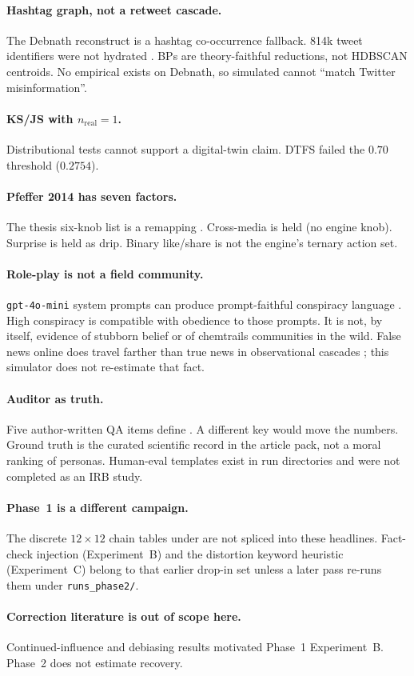 \paragraph{Hashtag graph, not a retweet cascade.}
The Debnath reconstruct is a hashtag co-occurrence fallback.
814k tweet identifiers were not hydrated \parencite{debnath2023dataset}.
BPs are theory-faithful reductions, not HDBSCAN centroids.
No empirical \MPR{} exists on Debnath, so simulated \MI{} cannot \enquote{match Twitter misinformation}.

\paragraph{KS/JS with $n_{\mathrm{real}}=1$.}
Distributional tests cannot support a digital-twin claim.
DTFS failed the $0.70$ threshold ($0.2754$).

\paragraph{Pfeffer 2014 has seven factors.}
The thesis six-knob list is a remapping \parencite{pfeffer2014firestorms}.
Cross-media is held (no engine knob).
Surprise is held as drip.
Binary like/share is not the engine's ternary action set.

\paragraph{Role-play is not a field community.}
\texttt{gpt-4o-mini} system prompts can produce prompt-faithful conspiracy language \parencite{park2023generative}.
High conspiracy \MPR{} is compatible with obedience to those prompts.
It is not, by itself, evidence of stubborn belief or of chemtrails communities in the wild.
False news online does travel farther than true news in observational cascades \parencite{vosoughi2018false}; this simulator does not re-estimate that fact.

\paragraph{Auditor as truth.}
Five author-written QA items define \MI{}.
A different key would move the numbers.
Ground truth is the curated scientific record in the article pack, not a moral ranking of personas.
Human-eval templates exist in run directories and were not completed as an IRB study.

\paragraph{Phase~1 is a different campaign.}
The discrete $12\times 12$ chain tables under  are not spliced into these headlines.
Fact-check injection (Experiment~B) and the distortion keyword heuristic (Experiment~C) belong to that earlier drop-in set unless a later pass re-runs them under \texttt{runs\_phase2/}.

\paragraph{Correction literature is out of scope here.}
Continued-influence and debiasing results \parencite{lewandowsky2012misinformation} motivated Phase~1 Experiment~B.
Phase~2 does not estimate recovery.
